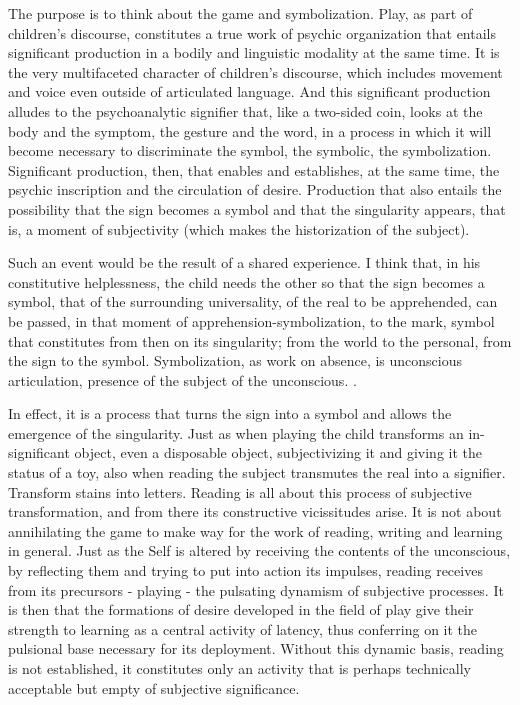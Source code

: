 \documentclass[english]{textolivre}
\begin{document}
The purpose is to think about the game and symbolization. Play, as part of children's discourse, constitutes a true work of psychic organization that entails significant production in a bodily and linguistic modality at the same time. It is the very multifaceted character of children's discourse, which includes movement and voice even outside of articulated language. And this significant production alludes to the psychoanalytic signifier that, like a two-sided coin, looks at the body and the symptom, the gesture and the word, in a process in which it will become necessary to discriminate the symbol, the symbolic, the symbolization. Significant production, then, that enables and establishes, at the same time, the psychic inscription and the circulation of desire. Production that also entails the possibility that the sign becomes a symbol and that the singularity appears, that is, a moment of subjectivity (which makes the historization of the subject).

Such an event would be the result of a shared experience. I think that, in his constitutive helplessness, the child needs the other so that the sign becomes a symbol, that of the surrounding universality, of the real to be apprehended, can be passed, in that moment of apprehension-symbolization, to the mark, symbol that constitutes from then on its singularity; from the world to the personal, from the sign to the symbol. Symbolization, as work on absence, is unconscious articulation, presence of the subject of the unconscious.  \cite{casas_de_pereda_en_1999}.

In effect, it is a process that turns the sign into a symbol and allows the emergence of the singularity. Just as when playing the child transforms an in-significant object, even a disposable object, subjectivizing it and giving it the status of a toy, also when reading the subject transmutes the real into a signifier. Transform stains into letters. Reading is all about this process of subjective transformation, and from there its constructive vicissitudes arise. It is not about annihilating the game to make way for the work of reading, writing and learning in general. Just as the Self is altered by receiving the contents of the unconscious, by reflecting them and trying to put into action its impulses, reading receives from its precursors - playing - the pulsating dynamism of subjective processes. It is then that the formations of desire developed in the field of play give their strength to learning as a central activity of latency, thus conferring on it the pulsional base necessary for its deployment. Without this dynamic basis, reading is not established, it constitutes only an activity that is perhaps technically acceptable but empty of subjective significance.
\end{document}
